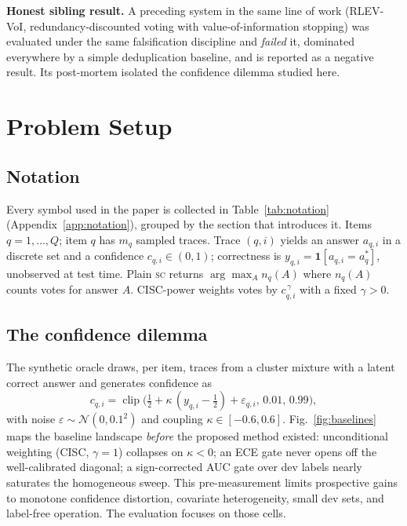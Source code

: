 \documentclass[conference]{IEEEtran}
\newcommand{\SC}{\textsc{sc}}
\begin{document}
\textbf{Honest sibling result.} A preceding system in the same line of work
(RLEV-VoI, redundancy-discounted voting with value-of-information stopping)
was evaluated under the same falsification discipline and \emph{failed} it,
dominated everywhere by a simple deduplication baseline, and is reported as a
negative result. Its post-mortem isolated the confidence dilemma studied
here.%


\section{Problem Setup}\label{sec:setup}

\subsection{Notation}
Every symbol used in the paper is collected in Table~\ref{tab:notation} (Appendix~\ref{app:notation}), grouped by the section that introduces it.
Items $q=1,\dots,Q$; item $q$ has $m_q$ sampled traces. Trace $(q,i)$ yields an answer $a_{q,i}$ in a discrete set and a confidence $c_{q,i}\in(0,1)$; correctness is $y_{q,i}=\mathbf{1}[a_{q,i}=a_q^\ast]$, unobserved at test time. Plain \SC{} returns $\arg\max_A n_q(A)$ where $n_q(A)$ counts votes for answer $A$. CISC-power weights votes by $c_{q,i}^{\,\gamma}$ with a fixed $\gamma>0$.

\subsection{The confidence dilemma}
The synthetic oracle draws, per item, traces from a cluster mixture with a latent correct answer and generates confidence as
\begin{equation}\label{eq:confmodel}
c_{q,i}=\operatorname{clip}\!\big(\tfrac12+\kappa\,(y_{q,i}-\tfrac12)+\varepsilon_{q,i},\,0.01,\,0.99\big),
\end{equation}
with noise $\varepsilon\sim\mathcal{N}(0,0.1^2)$ and coupling $\kappa\in[-0.6,0.6]$. Fig.~\ref{fig:baselines} maps the baseline landscape \emph{before} the proposed method existed: unconditional weighting (CISC, $\gamma=1$) collapses on $\kappa<0$; an ECE gate never opens off the well-calibrated diagonal; a sign-corrected AUC gate over dev labels nearly saturates the homogeneous sweep. This pre-measurement limits prospective gains to monotone confidence distortion, covariate heterogeneity, small dev sets, and label-free operation. The evaluation focuses on those cells.
\end{document}
